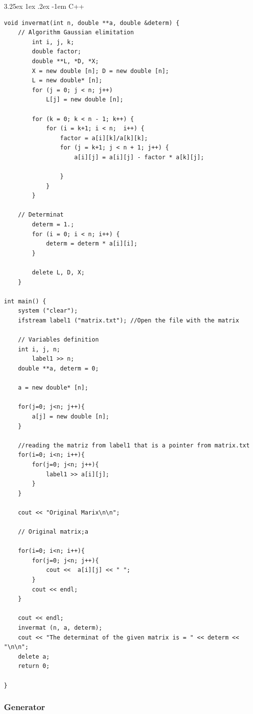 \documentclass{article}
\makeatletter
\renewcommand\paragraph{\@startsection{paragraph}{5}{\z@}%
  {3.25ex \@plus1ex \@minus.2ex}%
  {-1em}%
  {\normalfont\normalsize\bfseries}}
\makeatother
\begin{document}
\paragraph{C++}
\hfill \break
\begin{lstlisting}
void invermat(int n, double **a, double &determ) {
    // Algorithm Gaussian elimitation 
        int i, j, k;
        double factor;
        double **L, *D, *X;
        X = new double [n]; D = new double [n];
        L = new double* [n];
        for (j = 0; j < n; j++)
            L[j] = new double [n];
    
        for (k = 0; k < n - 1; k++) {
            for (i = k+1; i < n;  i++) {
                factor = a[i][k]/a[k][k];
                for (j = k+1; j < n + 1; j++) {
                    a[i][j] = a[i][j] - factor * a[k][j];
    
                }
            }
        }
    
    // Determinat
        determ = 1.;
        for (i = 0; i < n; i++) {
            determ = determ * a[i][i];
        }
    
        delete L, D, X;
    }

int main() {
    system ("clear");
    ifstream label1 ("matrix.txt"); //Open the file with the matrix

    // Variables definition 
    int i, j, n;
        label1 >> n;
    double **a, determ = 0;
    
    a = new double* [n];

    for(j=0; j<n; j++){
        a[j] = new double [n];
    }    

    //reading the matriz from label1 that is a pointer from matrix.txt
    for(i=0; i<n; i++){
        for(j=0; j<n; j++){
            label1 >> a[i][j];
        }
    }

    cout << "Original Marix\n\n";

    // Original matrix;a

    for(i=0; i<n; i++){
        for(j=0; j<n; j++){
            cout <<  a[i][j] << " ";
        }
        cout << endl;
    }

    cout << endl;
    invermat (n, a, determ);
    cout << "The determinat of the given matrix is = " << determ << "\n\n";
    delete a;
    return 0;

}
\end{lstlisting}

\subsubsection{Generator}
\end{document}
